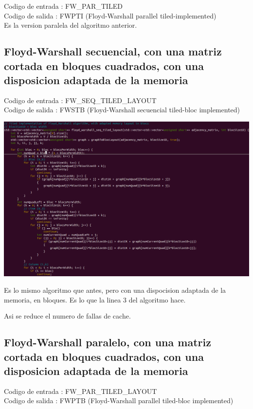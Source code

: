 \documentclass[a4paper,11pt]{article}
\begin{document}
\noindent Codigo de entrada : FW\_PAR\_TILED \\
Codigo de salida : FWPTI (Floyd-Warshall parallel tiled-implemented)\\

Es la version paralela del algoritmo anterior.

\subsection{Floyd-Warshall secuencial, con una matriz cortada en bloques cuadrados, con una disposicion adaptada de la memoria}

\noindent Codigo de entrada : FW\_SEQ\_TILED\_LAYOUT \\
Codigo de salida : FWSTB (Floyd-Warshall secuencial tiled-bloc implemented)

\begin{center}
  \includegraphics[scale=0.5]{FW_SEQ_TILED_LAYOUT.png}
\end{center}

Es lo mismo algoritmo que antes, pero con una dispocision adaptada de la memoria, en bloques. Es lo que la linea 3 del algoritmo hace.

Asi se reduce el numero de fallas de cache.

\subsection{Floyd-Warshall paralelo, con una matriz cortada en bloques cuadrados, con una disposicion adaptada de la memoria}

\noindent Codigo de entrada : FW\_PAR\_TILED\_LAYOUT \\
Codigo de salida : FWPTB (Floyd-Warshall parallel tiled-bloc implemented)\\
\end{document}
